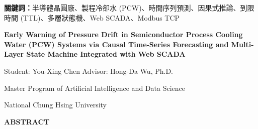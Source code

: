 \documentclass[fontset=none, a4paper, 12pt]{ctexart}
\begin{document}
\vspace{0.8cm}
\noindent\textbf{關鍵詞：}半導體晶圓廠、製程冷卻水 (PCW)、時間序列預測、因果式推論、到限時間 (TTL)、多層狀態機、Web SCADA、Modbus TCP

\newpage
\begin{center}
{\fontsize{18}{22}\selectfont\bfseries Early Warning of Pressure Drift in Semiconductor Process Cooling Water (PCW) Systems via Causal Time-Series Forecasting and Multi-Layer State Machine Integrated with Web SCADA\par}
\vspace{0.4cm}
{\fontsize{14}{18}\selectfont Student: You-Xing Chen \hspace{2cm} Advisor: Hong-Da Wu, Ph.D.\par}
\vspace{0.4cm}
{\fontsize{14}{18}\selectfont Master Program of Artificial Intelligence and Data Science\par National Chung Hsing University\par}
\vspace{0.8cm}
{\fontsize{16}{20}\selectfont\bfseries ABSTRACT\par}
\end{center}
\end{document}
